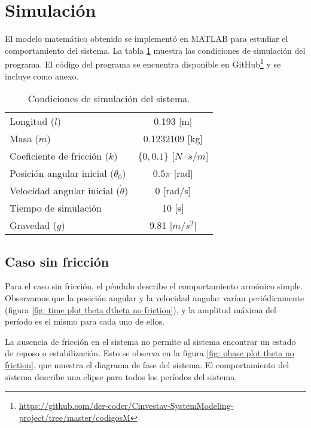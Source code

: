 \section{Simulación}

El modelo matemático obtenido se implementó en MATLAB 
para estudiar el comportamiento del sistema.
La tabla \ref{table: simulation conditions}
muestra las condiciones de simulación del programa.
El código del programa se encuentra disponible en 
GitHub\footnote{\url{https://github.com/der-coder/Cinvestav-SystemModeling-project/tree/master/codigosM}}
y se incluye como anexo.

\begin{table}[hb]
 \begin{center}
\begin{tabular}{lc}
\hline
Longitud ($l$) & 0.193 [m] \\
Masa ($m$) & 0.1232109 [kg]\\
Coeficiente de fricción ($k$) & $\{0,0.1\}$ [$N \cdot s / m$] \\
Posición angular inicial ($\theta_0$) & $0.5\pi$ [rad] \\
Velocidad angular inicial ($\dot{\theta}$) & 0 [rad/s] \\
Tiempo de simulación & 10 [s]  \\
Gravedad ($g$) & 9.81 [$m/s^2$]  \\
\hline
 \end{tabular}
 \end{center}
 \caption{Condiciones de simulación del sistema.}
\label{table: simulation conditions}
\end{table}

\subsection{Caso sin fricción}

Para el caso sin fricción, el péndulo describe 
el comportamiento armónico simple. 
Observamos que la posición angular y la velocidad angular
varían periódicamente (figura \ref{fig: time plot theta dtheta no friction}), y la amplitud máxima
del período es el mismo para cada uno de ellos.

La ausencia de fricción en el sistema no permite al sistema
encontrar un estado de reposo o estabilización. 
Esto se observa en la figura \ref{fig: phase plot theta no friction}, que
muestra el diagrama de fase del sistema.
El comportamiento del sistema describe una elipse para todos los períodos del sistema.


